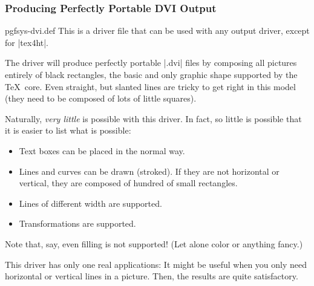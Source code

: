 \subsubsection{Producing Perfectly Portable DVI Output}

\begin{filedescription}{pgfsys-dvi.def}
  This is a driver file that can be used with any output driver,
  except for |tex4ht|.

  The driver will produce perfectly portable |.dvi| files by composing
  all pictures entirely of black rectangles, the basic and only graphic
  shape supported by the \TeX\ core. Even straight, but slanted lines
  are tricky to get right in this model (they need to be composed of
  lots of little squares).

  Naturally, \emph{very little} is possible with this driver. In fact,
  so little is possible that it is easier to list what is possible:
  \begin{itemize}
  \item Text boxes can be placed in the normal way.
  \item Lines and curves can be drawn (stroked). If they are not
    horizontal or vertical, they are composed of hundred of small
    rectangles.
  \item Lines of different width are supported.
  \item Transformations are supported.
  \end{itemize}
  Note that, say, even filling is not supported! (Let alone color or
  anything fancy.)

  This driver has only one real applications: It might be useful when
  you only need horizontal or vertical lines in a picture. Then, the
  results are quite satisfactory.
\end{filedescription}
